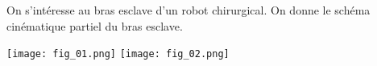 \def\xxactivite{ \ifprof \normalsize{Application 1 -- Corrigé } \else  \ifcolle Colle \else Application 1\fi \fi} %
\def\xxauteur{\textsl{Xavier Pessoles}}


\def\xxnumchapitre{Chapitre 1 \vspace{.2cm}}
\def\xxchapitre{\hspace{.12cm} Détermination des liaisons équivalentes}


\def\xxcompetences{%
\textsl{%
\textbf{Savoirs et compétences :}\\
\begin{itemize}[label=\ding{112},font=\color{ocre}] 
\item B2-15 : Simplifier un modèle de mécanisme.
\end{itemize}
}}


\def\xxtitreexo{Conception de la commande d’un robot chirurgical}
\def\xxsourceexo{\hspace{.2cm} \footnotesize{CCS PSI -- 2015}}


\def\xxfigures{
\texttt{[image: fig\_00]}
}%



\setcounter{numques}{0}
\setlength{\columnseprule}{.1pt}
\pagestyle{fancy}
\thispagestyle{plain}
\vspace{5.2cm}

\def\columnseprulecolor{\color{ocre}}
\setlength{\columnseprule}{0.4pt} 



\setcounter{exo}{0}


\ifprof
\begin{multicols}{2}
\else
\begin{multicols}{2}
\fi

On s'intéresse au bras esclave d'un robot chirurgical. On donne le schéma cinématique partiel du bras esclave.







\begin{center}
\texttt{[image: fig\_01.png]}
\hspace{1cm}
\texttt{[image: fig\_02.png]}
\end{center}

\ifprof
\end{multicols}
\else
\end{multicols}
\fi


